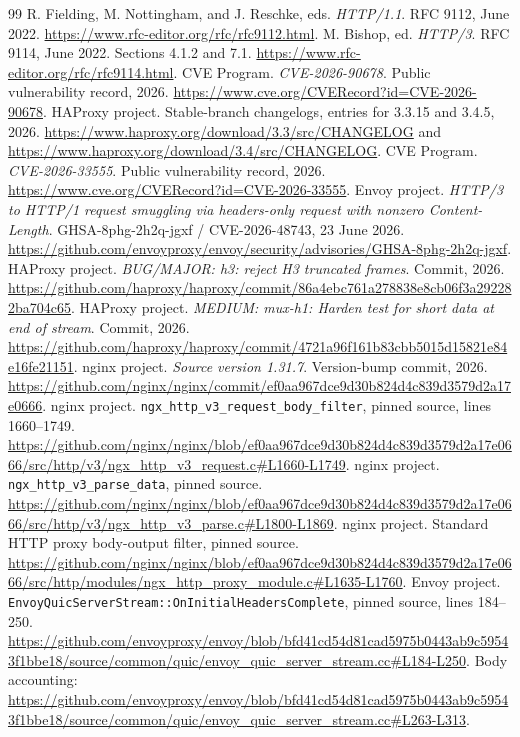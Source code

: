 \documentclass[11pt,letterpaper]{article}
\newcommand{\code}[1]{\nolinkurl{#1}}
\begin{document}
\begin{thebibliography}{99}
\small
{} R. Fielding, M. Nottingham, and J. Reschke, eds. \emph{HTTP/1.1}. RFC 9112, June 2022. \url{https://www.rfc-editor.org/rfc/rfc9112.html}.
 M. Bishop, ed. \emph{HTTP/3}. RFC 9114, June 2022. Sections 4.1.2 and 7.1. \url{https://www.rfc-editor.org/rfc/rfc9114.html}.
 CVE Program. \emph{CVE-2026-90678}. Public vulnerability record, 2026. \url{https://www.cve.org/CVERecord?id=CVE-2026-90678}.
 HAProxy project. Stable-branch changelogs, entries for 3.3.15 and 3.4.5, 2026. \url{https://www.haproxy.org/download/3.3/src/CHANGELOG} and \url{https://www.haproxy.org/download/3.4/src/CHANGELOG}.
 CVE Program. \emph{CVE-2026-33555}. Public vulnerability record, 2026. \url{https://www.cve.org/CVERecord?id=CVE-2026-33555}.
 Envoy project. \emph{HTTP/3 to HTTP/1 request smuggling via headers-only request with nonzero Content-Length}. GHSA-8phg-2h2q-jgxf / CVE-2026-48743, 23 June 2026. \url{https://github.com/envoyproxy/envoy/security/advisories/GHSA-8phg-2h2q-jgxf}.
 HAProxy project. \emph{BUG/MAJOR: h3: reject H3 truncated frames}. Commit, 2026. \url{https://github.com/haproxy/haproxy/commit/86a4ebc761a278838e8cb06f3a292282ba704c65}.
 HAProxy project. \emph{MEDIUM: mux-h1: Harden test for short data at end of stream}. Commit, 2026. \url{https://github.com/haproxy/haproxy/commit/4721a96f161b83cbb5015d15821e84e16fe21151}.
 nginx project. \emph{Source version 1.31.7}. Version-bump commit, 2026. \url{https://github.com/nginx/nginx/commit/ef0aa967dce9d30b824d4c839d3579d2a17e0666}.
 nginx project. \code{ngx_http_v3_request_body_filter}, pinned source, lines 1660--1749. \url{https://github.com/nginx/nginx/blob/ef0aa967dce9d30b824d4c839d3579d2a17e0666/src/http/v3/ngx_http_v3_request.c#L1660-L1749}.
 nginx project. \code{ngx_http_v3_parse_data}, pinned source. \url{https://github.com/nginx/nginx/blob/ef0aa967dce9d30b824d4c839d3579d2a17e0666/src/http/v3/ngx_http_v3_parse.c#L1800-L1869}.
 nginx project. Standard HTTP proxy body-output filter, pinned source. \url{https://github.com/nginx/nginx/blob/ef0aa967dce9d30b824d4c839d3579d2a17e0666/src/http/modules/ngx_http_proxy_module.c#L1635-L1760}.
 Envoy project. \code{EnvoyQuicServerStream::OnInitialHeadersComplete}, pinned source, lines 184--250. \url{https://github.com/envoyproxy/envoy/blob/bfd41cd54d81cad5975b0443ab9c59543f1bbe18/source/common/quic/envoy_quic_server_stream.cc#L184-L250}. Body accounting: \url{https://github.com/envoyproxy/envoy/blob/bfd41cd54d81cad5975b0443ab9c59543f1bbe18/source/common/quic/envoy_quic_server_stream.cc#L263-L313}.

\end{thebibliography}
\end{document}
